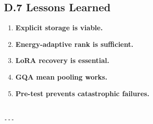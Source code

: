 \subsection{D.7 Lessons Learned}

\begin{enumerate}
\item \textbf{Explicit storage is viable.}
\item \textbf{Energy-adaptive rank is sufficient.}
\item \textbf{LoRA recovery is essential.}
\item \textbf{GQA mean pooling works.}
\item \textbf{Pre-test prevents catastrophic failures.}
\end{enumerate}
\begin{lstlisting}

---
\end{lstlisting}